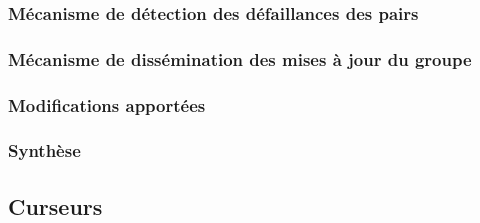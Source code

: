 \subsubsection{Mécanisme de détection des défaillances des pairs}


\subsubsection{Mécanisme de dissémination des mises à jour du groupe}


\subsubsection{Modifications apportées}


\subsubsection{Synthèse}


\subsection{Curseurs}






